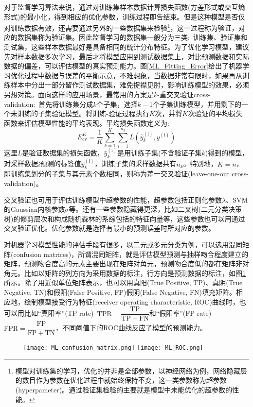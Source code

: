 对于监督学习算法来说，通过对训练集样本数据计算损失函数(方差形式或交互熵形式)的最小化，得到相应的优化参数，训练过程即告结束。但是这种模型是否仅对训练数据有效，还需要通过另外的一些数据集来检验\footnote{模型对训练集的学习，优化的并非是全部参数，以神经网络为例，网络隐藏层的数目作为参数在优化过程中就始终保持不变，这一类参数称为超参数(\textrm{hyperpameter})。通过验证集检验的主要就是模型中未能优化的超参数的性能。}，这一过程称为验证，对应的数据集称为验证集。因此监督学习的数据集一般分为三类:~训练集、验证集和测试集，这些样本数据最好是具备相同的统计分布特征。为了优化学习模型，建议先对样本数据多次学习，最后才将模型应用到测试数据集上，对比预测数据和实际数据的偏差，可以评估模型的真实预测能力。图\ref{ML_Fitting_Error}给出了机器学习优化过程中数据与误差的平衡示意，不难想象，当数据非常有限时，如果再从训练样本中分出一部分留作测试数据集，难免捉襟见肘，影响训练模型的效果，必须另想对策。面向这样的应用场景，最常用的方案是$k$-重交叉验证\textrm{cross-validation}:~首先将训练集分成$k$个子集，选择$k-1$个子集训练模型，并用剩下的一个未训练的子集验证模型。将训练-验证过程执行$K$次，并将$K$次验证的平均损失函数来评估模型性能的平均表现。平均损失函数定义为:
\begin{displaymath}
	E_{\mathrm{cv}}^{K}=\dfrac1K\sum_{k=1}^K\sum_{i=1}^{n_k}L(\hat{y}_k^{(\mathrm{i})},y^{(\mathrm{i})})
\end{displaymath}
这里$L$是验证数据集的损失函数，$\hat{y}_k^{(\mathrm{i})}$是用训练子集(不含验证子集$k$)得到的模型，对采样数据$i$预测的标签值$\hat{y}_k^{(\mathrm{i})}$，训练子集的采样数据共有$n_k$。特别地，$K=n$，即训练集划分的子集与其元素个数相同，则称为差一交叉验证\textrm{(leave-one-out cross-validation)}。


交叉验证也可用于评估训练模型中超参数的性能，超参数包括正则化参数$\lambda$、\textrm{SVM}的\textrm{Gaussian}内核参数$\sigma$等。还有一些参数隐藏得更深，比如二叉树(二元分类决策树)的修剪层次和构成随机森林的系综包括的特征向量等，这些参数也可以用通过交叉验证优化。优化参数就是选择有最小的预测误差时所对应的参数。

对机器学习模型性能的评估手段有很多，以二元或多元分类为例，可以选用混同矩阵\textrm{(confusion matrices)}，所谓混同矩阵，就是评估模型预测与抽样吻合程度建立的矩阵，预测吻合度高的元素主要出现在矩阵对角元，预测吻合度低的都在矩阵非对角元。比如以矩阵的列方向为采用数据的标注，行方向是预测数据的标注，如图\ref{ML_CM_ROC}所示。除了用近似单位矩阵表示，也可以用真阳\textrm{(True Positive, TP)}、真阴\textrm{(True Negative, TN)}和假阳\textrm{(False Positive, FP)}假阴\textrm{(False Negative, FN)}填充矩阵。相应地，绘制模型接受行为特征\textrm{(receiver operating characteristic, ROC)}曲线时，也可以用比如“真阳率”\textrm{(TP rate)}~$\mathrm{TPR}=\dfrac{\mathrm{TP}}{\mathrm{TP}+\mathrm{FN}}$和“假阳率”\textrm{(FP rate)}~$\mathrm{FPR}=\dfrac{\mathrm{FP}}{\mathrm{FP}+\mathrm{TN}}$，不同阈值下的\textrm{ROC}曲线反应了模型的预测能力。
\begin{figure}[h!]
\centering
\vspace*{-0.1in}
\texttt{[image: ML\_confusion\_matrix.png]}
\hskip 5pt
\texttt{[image: ML\_ROC.png]}
\caption{\fontsize{7.2pt}{4.2pt}}%
\label{ML_CM_ROC}
\end{figure}

